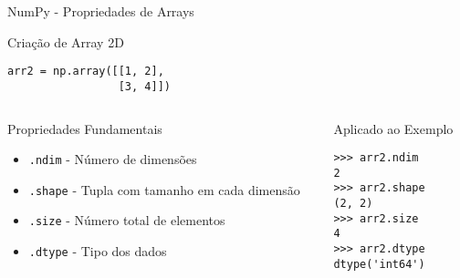 \begin{frame}[fragile]{NumPy - Propriedades de Arrays}

    \begin{block}{Criação de Array 2D}
        \begin{verbatim}
arr2 = np.array([[1, 2], 
                 [3, 4]])
\end{verbatim}
    \end{block}

    \begin{columns}[T]
        \begin{column}{0.6\textwidth}
            \begin{exampleblock}{Propriedades Fundamentais}
                \begin{itemize}
                    \item \texttt{.ndim} - Número de dimensões
                    \item \texttt{.shape} - Tupla com tamanho em cada dimensão
                    \item \texttt{.size} - Número total de elementos
                    \item \texttt{.dtype} - Tipo dos dados
                \end{itemize}
            \end{exampleblock}
        \end{column}

        \begin{column}{0.4\textwidth}
            \begin{alertblock}{Aplicado ao Exemplo}
                \begin{verbatim}
>>> arr2.ndim
2
>>> arr2.shape
(2, 2)
>>> arr2.size
4
>>> arr2.dtype
dtype('int64')
\end{verbatim}
            \end{alertblock}

        \end{column}
    \end{columns}
\end{frame}

